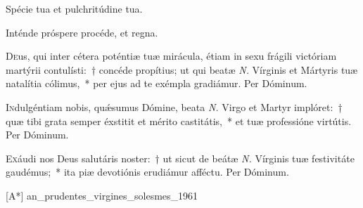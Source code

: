 \documentclass[vesperale_romanum.tex]{subfiles}
\begin{document}


\altertonus



\vel


\vv Spécie tua et pulchritúdine tua. \tpalleluia

\rr Inténde próspere procéde, et regna. \tpalleluia
\label{an_veni_sponsa_christi_i_vesperis_solesmes_1961}
{}


\lettrine{D}{e}us, qui inter cétera poténtiæ tuæ mirácula, étiam in sexu frágili victóriam martýrii contulísti:~† concéde propítius; ut qui beatæ \textit{N.} Vírginis et Mártyris tuæ natalítia cólimus,~* per ejus ad te exémpla gradiámur. Per Dóminum.

\aliaoratio

\lettrine{I}{n}dulgéntiam nobis, quǽsumus Dómine, beata \textit{N.} Virgo et Martyr implóret:~† quæ tibi grata semper éxstitit et mérito castitátis,~* et tuæ professióne virtútis. Per Dóminum.



\lettrine{E}{x}áudi nos Deus salutáris noster:~† ut sicut de beátæ \textit{N.} Vírginis tuæ festivitáte gaudémus;~* ita piæ devotiónis erudiámur afféctu.
Per Dóminum.


\label{an_prudentes_virgines_solesmes_1961}

[A*]
{an_prudentes_virgines_solesmes_1961}
\end{document}
